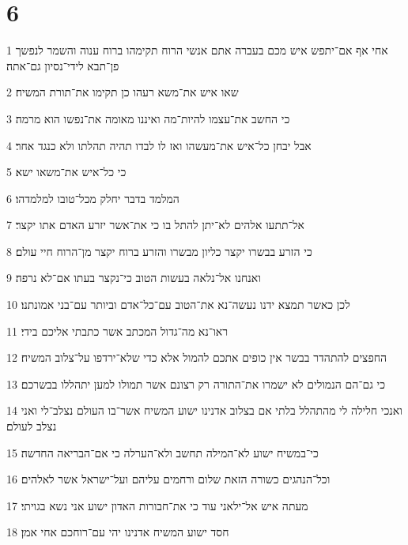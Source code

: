 \chapter{6}

\par 1 אחי אף אם־יתפש איש מכם בעברה אתם אנשי הרוח תקימהו ברוח ענוה והשמר לנפשך פן־תבא לידי־נסיון גם־אתה׃
\par 2 שאו איש את־משא רעהו כן תקימו את־תורת המשיח׃
\par 3 כי החשב את־עצמו להיות־מה ואיננו מאומה את־נפשו הוא מרמה׃
\par 4 אבל יבחן כל־איש את־מעשהו ואז לו לבדו תהיה תהלתו ולא כנגד אחר׃
\par 5 כי כל־איש את־משאו ישא׃
\par 6 המלמד בדבר יחלק מכל־טובו למלמדהו׃
\par 7 אל־תתעו אלהים לא־יתן להתל בו כי את־אשר יזרע האדם אתו יקצר׃
\par 8 כי הזרע בבשרו יקצר כליון מבשרו והזרע ברוח יקצר מן־הרוח חיי עולם׃
\par 9 ואנחנו אל־נלאה בעשות הטוב כי־נקצר בעתו אם־לא נרפה׃
\par 10 לכן כאשר תמצא ידנו נעשה־נא את־הטוב עם־כל־אדם וביותר עם־בני אמונתנו׃
\par 11 ראו־נא מה־גדול המכתב אשר כתבתי אליכם בידי׃
\par 12 החפצים להתהדר בבשר אין כופים אתכם להמול אלא כדי שלא־ירדפו על־צלוב המשיח׃
\par 13 כי גם־הם הנמולים לא ישמרו את־התורה רק רצונם אשר תמולו למען יתהללו בבשרכם׃
\par 14 ואנכי חלילה לי מהתהלל בלתי אם בצלוב אדנינו ישוע המשיח אשר־בו העולם נצלב־לי ואני נצלב לעולם׃
\par 15 כי־במשיח ישוע לא־המילה תחשב ולא־הערלה כי אם־הבריאה החדשה׃
\par 16 וכל־הנהגים כשורה הזאת שלום ורחמים עליהם ועל־ישראל אשר לאלהים׃
\par 17 מעתה איש אל־ילאני עוד כי את־חבורות האדון ישוע אני נשא בגויתי׃
\par 18 חסד ישוע המשיח אדנינו יהי עם־רוחכם אחי אמן׃


